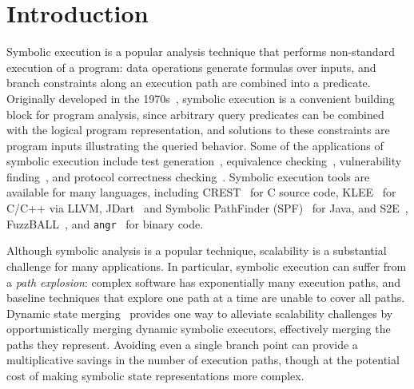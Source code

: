 \section{Introduction}
%
Symbolic execution is a popular analysis technique that performs non-standard execution of a program: data operations generate formulas over inputs, and  branch constraints along an execution path are combined into a predicate.
%
Originally developed in the 1970s~\cite{King1976,Clarke1976}, symbolic execution is a convenient building block for
program analysis, since arbitrary query predicates can be combined with the logical program representation, and
solutions to these constraints are program inputs illustrating the queried behavior.
%
Some of the applications of symbolic execution include
test generation~\cite{dart,cute}, equivalence checking~\cite{ramos,adaptorsynth}, vulnerability finding~\cite{driller,angr}, and protocol correctness checking~\cite{transport}.
%
Symbolic execution tools are available for many languages, including
CREST~\cite{BurnimS2008} for C source code, KLEE~\cite{CadarDE2008}
for C/C++ via LLVM, JDart~\cite{jdart2016} and Symbolic
PathFinder (SPF)~\cite{spf} for Java, and S2E~\cite{ChipounovKC2012},
FuzzBALL~\cite{BabicMMS2011}, and {\tt angr}~\cite{angr} for binary code.
%
%


Although symbolic analysis is a popular technique, scalability is a substantial challenge for many applications.
%
In particular, symbolic execution can suffer from a {\em path explosion}: complex
software has exponentially many execution paths, and baseline 
techniques that explore one path at a time are unable to
cover all paths.
%
Dynamic state merging~\cite{HansenSS2009,kuznetsov} provides one way to
alleviate scalability challenges by opportunistically merging dynamic
symbolic executors, effectively merging the paths they represent.
%
Avoiding even a single branch point can provide a multiplicative
savings in the number of execution paths, though at the potential cost
of making symbolic state representations more complex.

